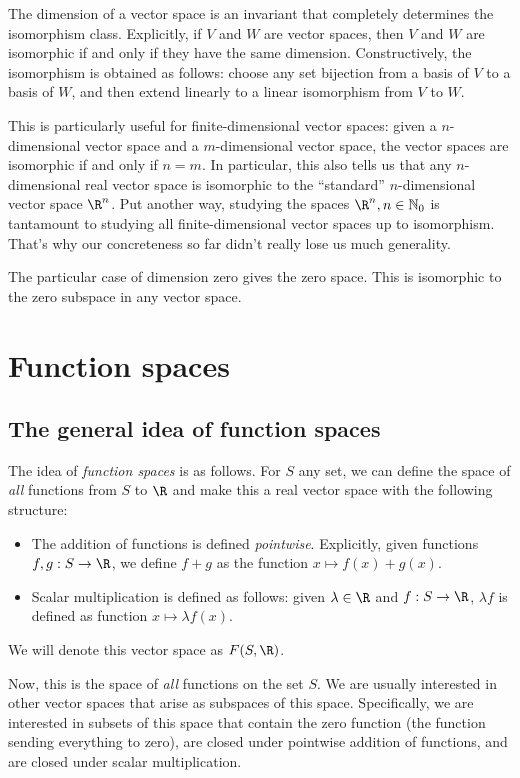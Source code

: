 \documentclass[10pt]{amsart}
\begin{document}
The dimension of a vector space is an invariant that completely
determines the isomorphism class. Explicitly, if $V$ and $W$ are
vector spaces, then $V$ and $W$ are isomorphic if and only if they
have the same dimension. Constructively, the isomorphism is obtained
as follows: choose any set bijection from a basis of $V$ to a basis of
$W$, and then extend linearly to a linear isomorphism from $V$ to $W$.

This is particularly useful for finite-dimensional vector spaces:
given a $n$-dimensional vector space and a $m$-dimensional vector
space, the vector spaces are isomorphic if and only if $n = m$. In
particular, this also tells us that any $n$-dimensional real vector
space is isomorphic to the ``standard'' $n$-dimensional vector space
$\R^n$. Put another way, studying the spaces $\R^n, n \in
\mathbb{N}_0$ is tantamount to studying all finite-dimensional vector
spaces up to isomorphism. That's why our concreteness so far didn't
really lose us much generality.

The particular case of dimension zero gives the zero space. This is
isomorphic to the zero subspace in any vector space.

\section{Function spaces}

\subsection{The general idea of function spaces}

The idea of {\em function spaces} is as follows. For $S$ any set, we
can define the space of {\em all} functions from $S$ to $\R$ and make
this a real vector space with the following structure:

\begin{itemize}
\item The addition of functions is defined {\em
  pointwise}. Explicitly, given functions $f,g: S \to \R$, we define
  $f + g$ as the function $x \mapsto f(x) + g(x)$.
\item Scalar multiplication is defined as follows: given $\lambda \in
  \R$ and $f: S \to \R$, $\lambda f$ is defined as function $x \mapsto
  \lambda f(x)$.
\end{itemize}

We will denote this vector space as $F(S,\R)$. 

Now, this is the space of {\em all} functions on the set $S$. We are
usually interested in other vector spaces that arise as subspaces of
this space. Specifically, we are interested in subsets of this space
that contain the zero function (the function sending everything to
zero), are closed under pointwise addition of functions, and are
closed under scalar multiplication.
\end{document}

